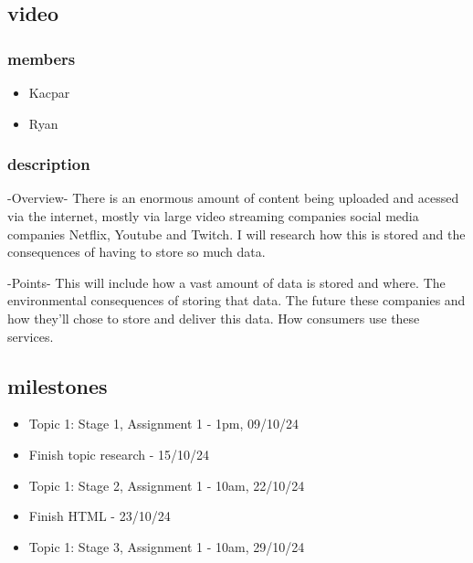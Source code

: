 \documentclass{article}
\begin{document}
\subsection{video}
\subsubsection{members}
\begin{itemize}
    \item Kacpar
    \item Ryan
\end{itemize}
\subsubsection{description}
    -Overview-
    There is an enormous amount of content being uploaded and acessed via the internet, mostly via large video 
    streaming companies social media companies Netflix, Youtube and Twitch. I will research
    how this is stored and the consequences of having to store so much data.

    -Points-
    This will include how a vast amount of data is stored and where. 
    The environmental consequences of storing that data.
    The future these companies and how they'll chose to store and deliver this data.
    How consumers use these services.

\subsection{milestones}
\begin{itemize}
    \item Topic 1: Stage 1, Assignment 1 - 1pm, 09/10/24
    \item Finish topic research - 15/10/24
    \item Topic 1: Stage 2, Assignment 1 - 10am, 22/10/24
    \item Finish HTML - 23/10/24
    \item Topic 1: Stage 3, Assignment 1 - 10am, 29/10/24
\end{itemize}
\end{document}
